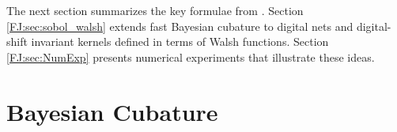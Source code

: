 \documentclass[graybox,footinfo]{svmult}
\newcommand{\FJHNote}[1]{{\textcolor{blue}{FJH: #1}}}
\begin{document}

The next section summarizes the key formulae from \cite{RatHic19a}.  Section \ref{FJ:sec:sobol_walsh} extends fast Bayesian cubature to digital nets and digital-shift invariant kernels defined in terms of Walsh functions.  Section \ref{FJ:sec:NumExp} presents numerical experiments that illustrate these ideas.  




\section{Bayesian Cubature}
\label{FJ:sec:BC} 


\end{document}
